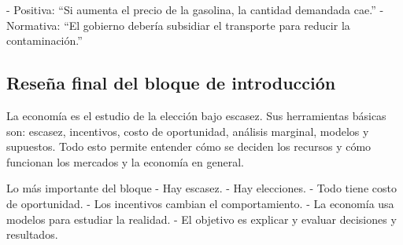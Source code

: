 \begin{ejemplo}
- Positiva: “Si aumenta el precio de la gasolina, la cantidad demandada cae.”
- Normativa: “El gobierno debería subsidiar el transporte para reducir la contaminación.”
\end{ejemplo}

\subsection{Reseña final del bloque de introducción}

La economía es el estudio de la elección bajo escasez. Sus herramientas básicas son: escasez, incentivos, costo de oportunidad, análisis marginal, modelos y supuestos. Todo esto permite entender cómo se deciden los recursos y cómo funcionan los mercados y la economía en general.

\begin{resumen}{Lo más importante del bloque}
- Hay escasez.
- Hay elecciones.
- Todo tiene costo de oportunidad.
- Los incentivos cambian el comportamiento.
- La economía usa modelos para estudiar la realidad.
- El objetivo es explicar y evaluar decisiones y resultados.
\end{resumen}
